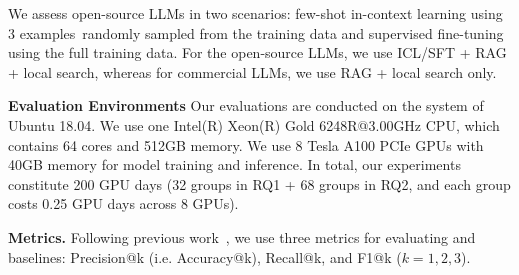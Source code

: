 We assess open-source LLMs in two scenarios: few-shot in-context learning using 3 examples\
randomly sampled from the training data and supervised fine-tuning using the full training data.
For the open-source LLMs, we use ICL/SFT + RAG + local search, whereas for commercial LLMs, we use RAG + local search only. 




\noindent \textbf{Evaluation Environments}
Our evaluations are conducted on the system of Ubuntu 18.04. 
We use one Intel(R) Xeon(R) Gold 6248R@3.00GHz CPU, which contains 64 cores and 512GB memory.
We use 8 Tesla A100 PCIe GPUs with 40GB memory for model training and inference. 
In total, our experiments constitute 200 GPU days (32 groups in RQ1 + 68 groups in RQ2, and each group costs 0.25 GPU days across 8 GPUs).


\noindent \textbf{Metrics.}
Following previous work~\cite{vullibminer, fastxml}, we use three metrics for evaluating \detector{} and baselines: Precision@k (i.e. Accuracy@k), Recall@k, and F1@k ($k=1,2,3$).





